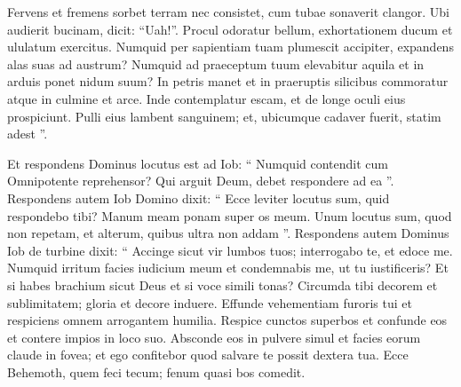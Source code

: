 \begin{biblechapter}
\begin{biblechapter}
\begin{biblechapter}
\begin{biblechapter}
\begin{biblechapter}
\begin{biblechapter}
\begin{biblechapter}
\begin{biblechapter}
\begin{biblechapter}
\begin{biblechapter}
\begin{biblechapter}
\begin{biblechapter}
\begin{biblechapter}
\begin{biblechapter}
\begin{biblechapter}
\begin{biblechapter}
\begin{biblechapter}
\begin{biblechapter}
\begin{biblechapter}
\begin{biblechapter}
\begin{biblechapter}
\begin{biblechapter}
\begin{biblechapter}
\begin{biblechapter}
\begin{biblechapter}
\begin{biblechapter}
\begin{biblechapter}
\begin{biblechapter}
\begin{biblechapter}
\begin{biblechapter}
\begin{biblechapter}
\begin{biblechapter}
\begin{biblechapter}
\begin{biblechapter}
\begin{biblechapter}
\begin{biblechapter}
\begin{biblechapter}
\begin{biblechapter}
\begin{biblechapter}
 \verse Fervens et fremens sorbet terram
 nec consistet, cum tubae sonaverit clangor.
 \verse Ubi audierit bucinam, dicit: “Uah!”.
 Procul odoratur bellum,
 exhortationem ducum et ululatum exercitus.
 \verse Numquid per sapientiam tuam plumescit accipiter,
 expandens alas suas ad austrum?
 \verse Numquid ad praeceptum tuum elevabitur aquila
 et in arduis ponet nidum suum?
 \verse In petris manet
 et in praeruptis silicibus commoratur
 atque in culmine et arce.
 \verse Inde contemplatur escam,
 et de longe oculi eius prospiciunt.
 \verse Pulli eius lambent sanguinem;
 et, ubicumque cadaver fuerit, statim adest ”.
 
\begin{biblechapter}
\verse Et respondens Dominus locutus est ad Iob:
 \verse “ Numquid contendit cum Omnipotente reprehensor?
 Qui arguit Deum, debet respondere ad ea ”.
 \verse Respondens autem Iob Domino dixit:
 \verse “ Ecce leviter locutus sum, quid respondebo tibi?
 Manum meam ponam super os meum.
 \verse Unum locutus sum, quod non repetam,
 et alterum, quibus ultra non addam ”.
 \verse Respondens autem Dominus Iob de turbine dixit:
 \verse “ Accinge sicut vir lumbos tuos;
 interrogabo te, et edoce me.
 \verse Numquid irritum facies iudicium meum
 et condemnabis me, ut tu iustificeris?
 \verse Et si habes brachium sicut Deus
 et si voce simili tonas?
 \verse Circumda tibi decorem et sublimitatem;
 gloria et decore induere.
 \verse Effunde vehementiam furoris tui
 et respiciens omnem arrogantem humilia.
 \verse Respice cunctos superbos et confunde eos
 et contere impios in loco suo.
 \verse Absconde eos in pulvere simul
 et facies eorum claude in fovea;
 \verse et ego confitebor
 quod salvare te possit dextera tua.
 \verse Ecce Behemoth, quem feci tecum;
 fenum quasi bos comedit.

\end{biblechapter}
\end{biblechapter}
\end{biblechapter}
\end{biblechapter}
\end{biblechapter}
\end{biblechapter}
\end{biblechapter}
\end{biblechapter}
\end{biblechapter}
\end{biblechapter}
\end{biblechapter}
\end{biblechapter}
\end{biblechapter}
\end{biblechapter}
\end{biblechapter}
\end{biblechapter}
\end{biblechapter}
\end{biblechapter}
\end{biblechapter}
\end{biblechapter}
\end{biblechapter}
\end{biblechapter}
\end{biblechapter}
\end{biblechapter}
\end{biblechapter}
\end{biblechapter}
\end{biblechapter}
\end{biblechapter}
\end{biblechapter}
\end{biblechapter}
\end{biblechapter}
\end{biblechapter}
\end{biblechapter}
\end{biblechapter}
\end{biblechapter}
\end{biblechapter}
\end{biblechapter}
\end{biblechapter}
\end{biblechapter}
\end{biblechapter}
